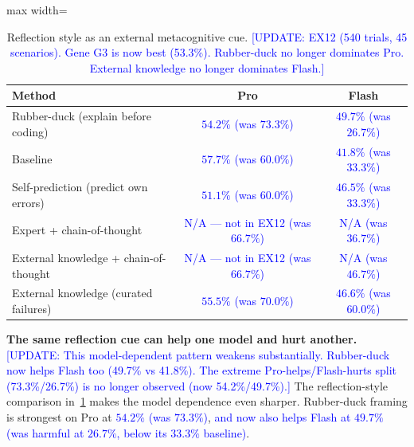 \documentclass{article}
\newcommand{\blue}[1]{\textcolor{blue}{#1}}
\newcommand{\nbf}[1]{{\noindent \textbf{#1}}}
\begin{document}
\begin{table}[h]
\centering
\caption{Reflection style as an external metacognitive cue. \blue{[UPDATE: EX12 (540 trials, 45 scenarios). Gene G3 is now best (53.3\%). Rubber-duck no longer dominates Pro. External knowledge no longer dominates Flash.]}}
\label{tab:reflection_style}
\begin{adjustbox}{max width=\textwidth}
\begin{tabular}{lcc}
\toprule
\textbf{Method} & \textbf{Pro} & \textbf{Flash} \\
\midrule
Rubber-duck (explain before coding) & \cellcolor{bestRow}\blue{$54.2\%$ (was $73.3\%$)} & \blue{$49.7\%$ (was $26.7\%$)} \\
Baseline & \blue{$57.7\%$ (was $60.0\%$)} & \blue{$41.8\%$ (was $33.3\%$)} \\
Self-prediction (predict own errors) & \blue{$51.1\%$ (was $60.0\%$)} & \blue{$46.5\%$ (was $33.3\%$)} \\
Expert + chain-of-thought & \blue{N/A --- not in EX12 (was $66.7\%$)} & \blue{N/A (was $36.7\%$)} \\
External knowledge + chain-of-thought & \blue{N/A --- not in EX12 (was $66.7\%$)} & \blue{N/A (was $46.7\%$)} \\
\cellcolor{bestRow}External knowledge (curated failures) & \cellcolor{bestRow}\blue{$55.5\%$ (was $70.0\%$)} & \cellcolor{bestRow}\blue{$46.6\%$ (was $60.0\%$)} \\
\bottomrule
\end{tabular}
\end{adjustbox}
\end{table}

\nbf{The same reflection cue can help one model and hurt another.}
\blue{[UPDATE: This model-dependent pattern weakens substantially. Rubber-duck now helps Flash too (49.7\% vs 41.8\%). The extreme Pro-helps/Flash-hurts split (73.3\%/26.7\%) is no longer observed (now 54.2\%/49.7\%).]}
The reflection-style comparison in~\cref{tab:reflection_style} makes the model dependence even sharper.
Rubber-duck framing is strongest on Pro at \blue{$54.2\%$ (was $73.3\%$)}, \blue{and now also helps Flash at $49.7\%$ (was harmful at $26.7\%$, below its $33.3\%$ baseline)}.
\end{document}
